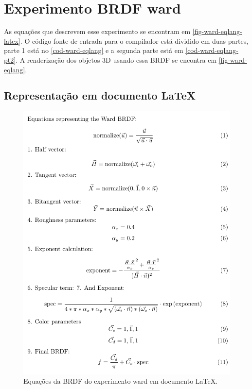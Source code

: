\section{Experimento BRDF ward}

As equações que descrevem esse experimento se encontram em \autoref{fig-ward-eqlang-latex}. O código fonte de entrada para o compilador está dividido em duas partes, parte 1 está no \autoref{cod-ward-eqlang} e a segunda parte está em \autoref{cod-ward-eqlang-pt2}. A renderização dos objetos 3D usando essa BRDF se encontra em \autoref{fig-ward-eqlang}.

\subsection{Representação em documento \LaTeX{}}
\begin{figure}[H]
    \caption{\label{fig-ward-eqlang-latex} \small Equações da BRDF do experimento ward em documento \LaTeX{}.}
    \begin{center}
        \includegraphics[scale=0.92]{./Imagens/brdfs/ward.pdf}
    \end{center}
\end{figure}

